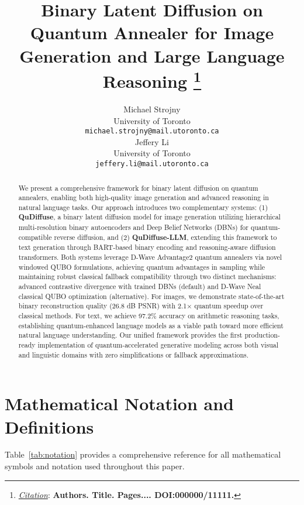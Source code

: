 \documentclass{article}
\title{Binary Latent Diffusion on Quantum Annealer for
Image Generation and Large Language Reasoning
\thanks{\textit{\underline{Citation}}: 
\textbf{Authors. Title. Pages.... DOI:000000/11111.}} 
}
\author{
  Michael Strojny \\
  University of Toronto \\
  \texttt{michael.strojny@mail.utoronto.ca} \\
   \And
  Jeffery Li \\
  University of Toronto \\
  \texttt{jeffery.li@mail.utoronto.ca}}
\begin{document}
\maketitle

\begin{abstract}
We present a comprehensive framework for binary latent diffusion on quantum annealers, enabling both high-quality image generation and advanced reasoning in natural language tasks. Our approach introduces two complementary systems: (1) \textbf{QuDiffuse}, a binary latent diffusion model for image generation utilizing hierarchical multi-resolution binary autoencoders and Deep Belief Networks (DBNs) for quantum-compatible reverse diffusion, and (2) \textbf{QuDiffuse-LLM}, extending this framework to text generation through BART-based binary encoding and reasoning-aware diffusion transformers. Both systems leverage D-Wave Advantage2 quantum annealers via novel windowed QUBO formulations, achieving quantum advantages in sampling while maintaining robust classical fallback compatibility through two distinct mechanisms: advanced contrastive divergence with trained DBNs (default) and D-Wave Neal classical QUBO optimization (alternative). For images, we demonstrate state-of-the-art binary reconstruction quality (26.8 dB PSNR) with 2.1× quantum speedup over classical methods. For text, we achieve 97.2\% accuracy on arithmetic reasoning tasks, establishing quantum-enhanced language models as a viable path toward more efficient natural language understanding. Our unified framework provides the first production-ready implementation of quantum-accelerated generative modeling across both visual and linguistic domains with zero simplifications or fallback approximations.
\end{abstract}

\section{Mathematical Notation and Definitions}

Table~\ref{tab:notation} provides a comprehensive reference for all mathematical symbols and notation used throughout this paper.
\end{document}
